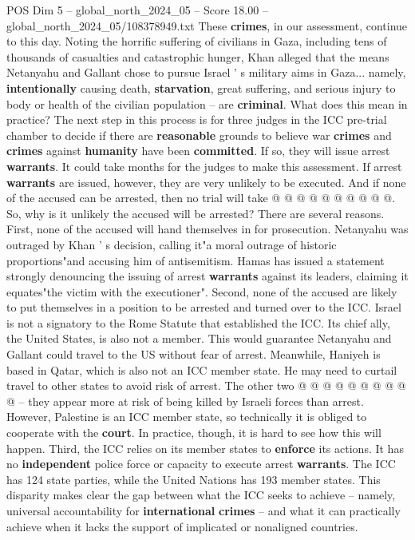 \begin{textsample}{POS Dim 5 – global\_north\_2024\_05 – Score 18.00 – global\_north\_2024\_05/108378949.txt}
These \textbf{crimes}, in our assessment, continue to this day.
Noting the horrific suffering of civilians in Gaza, including tens of thousands of casualties and catastrophic hunger, Khan alleged that the means Netanyahu and Gallant chose to pursue Israel ' s military aims in Gaza... namely, \textbf{intentionally} causing death, \textbf{starvation}, great suffering, and serious injury to body or health of the civilian population -- are \textbf{criminal}.
What does this mean in practice?
The next step in this process is for three judges in the ICC pre-trial chamber to decide if there are \textbf{reasonable} grounds to believe war \textbf{crimes} and \textbf{crimes} against \textbf{humanity} have been \textbf{committed}.
If so, they will issue arrest \textbf{warrants}.
It could take months for the judges to make this assessment.
If arrest \textbf{warrants} are issued, however, they are very unlikely to be executed.
And if none of the accused can be arrested, then no trial will take @ @ @ @ @ @ @ @ @ @.
So, why is it unlikely the accused will be arrested?
There are several reasons.
First, none of the accused will hand themselves in for prosecution.
Netanyahu was outraged by Khan ' s decision, calling it"a moral outrage of historic proportions"and accusing him of antisemitism.
Hamas has issued a statement strongly denouncing the issuing of arrest \textbf{warrants} against its leaders, claiming it equates"the victim with the executioner".
Second, none of the accused are likely to put themselves in a position to be arrested and turned over to the ICC.
Israel is not a signatory to the Rome Statute that established the ICC.
Its chief ally, the United States, is also not a member.
This would guarantee Netanyahu and Gallant could travel to the US without fear of arrest.
Meanwhile, Haniyeh is based in Qatar, which is also not an ICC member state.
He may need to curtail travel to other states to avoid risk of arrest.
The other two @ @ @ @ @ @ @ @ @ @ -- they appear more at risk of being killed by Israeli forces than arrest.
However, Palestine is an ICC member state, so technically it is obliged to cooperate with the \textbf{court}.
In practice, though, it is hard to see how this will happen.
Third, the ICC relies on its member states to \textbf{enforce} its actions.
It has no \textbf{independent} police force or capacity to execute arrest \textbf{warrants}.
The ICC has 124 state parties, while the United Nations has 193 member states.
This disparity makes clear the gap between what the ICC seeks to achieve -- namely, universal accountability for \textbf{international} \textbf{crimes} -- and what it can practically achieve when it lacks the support of implicated or nonaligned countries.

\end{textsample}
